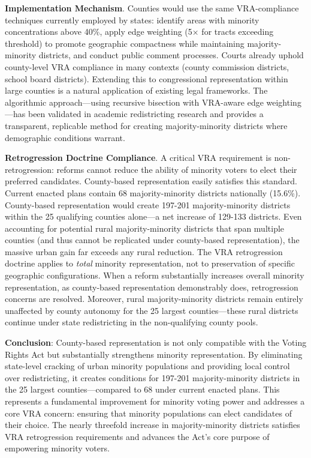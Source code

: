 \textbf{Implementation Mechanism}. Counties would use the same VRA-compliance techniques currently employed by states: identify areas with minority concentrations above 40\%, apply edge weighting (5$\times$ for tracts exceeding threshold) to promote geographic compactness while maintaining majority-minority districts, and conduct public comment processes. Courts already uphold county-level VRA compliance in many contexts (county commission districts, school board districts). Extending this to congressional representation within large counties is a natural application of existing legal frameworks. The algorithmic approach---using recursive bisection with VRA-aware edge weighting---has been validated in academic redistricting research and provides a transparent, replicable method for creating majority-minority districts where demographic conditions warrant.

\textbf{Retrogression Doctrine Compliance}. A critical VRA requirement is non-retrogression: reforms cannot reduce the ability of minority voters to elect their preferred candidates. County-based representation easily satisfies this standard. Current enacted plans contain 68 majority-minority districts nationally (15.6\%). County-based representation would create 197-201 majority-minority districts within the 25 qualifying counties alone---a net increase of 129-133 districts. Even accounting for potential rural majority-minority districts that span multiple counties (and thus cannot be replicated under county-based representation), the massive urban gain far exceeds any rural reduction. The VRA retrogression doctrine applies to \emph{total} minority representation, not to preservation of specific geographic configurations. When a reform substantially increases overall minority representation, as county-based representation demonstrably does, retrogression concerns are resolved. Moreover, rural majority-minority districts remain entirely unaffected by county autonomy for the 25 largest counties---these rural districts continue under state redistricting in the non-qualifying county pools.

\textbf{Conclusion}: County-based representation is not only compatible with the Voting Rights Act but substantially strengthens minority representation. By eliminating state-level cracking of urban minority populations and providing local control over redistricting, it creates conditions for 197-201 majority-minority districts in the 25 largest counties---compared to 68 under current enacted plans. This represents a fundamental improvement for minority voting power and addresses a core VRA concern: ensuring that minority populations can elect candidates of their choice. The nearly threefold increase in majority-minority districts satisfies VRA retrogression requirements and advances the Act's core purpose of empowering minority voters.
